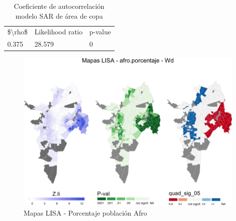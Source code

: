 \documentclass[12pt,]{book}
\begin{document}
\begin{table}

\caption{\label{tab:coef-rho-copaap}Coeficiente de autocorrelación modelo SAR de área de copa}
\centering
\begin{tabular}[t]{lll}
\toprule
\$\textbackslash{}rho\$ & Likelihood ratio & p-value\\
0.375 & 28.579 & 0\\
\bottomrule
\end{tabular}
\end{table}

\begin{figure}
\includegraphics[width=1\linewidth]{tesis-unigis_files/figure-latex/lisa-afro-1} \caption{Mapas LISA - Porcentaje población Afro}\label{fig:lisa-afro}
\end{figure}
\end{document}
